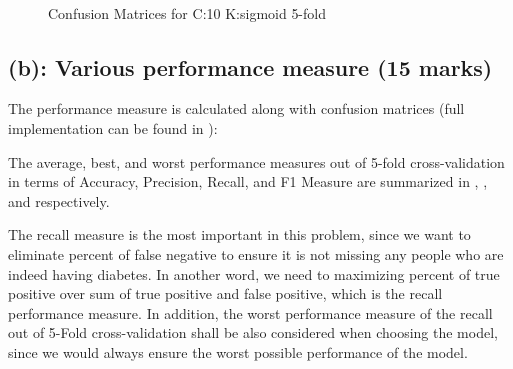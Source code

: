 \documentclass{tron}
\begin{document}
\begin{figure}[H]
 \,
 \,
\caption{Confusion Matrices for C:10 K:sigmoid 5-fold}
\label{table:confusion:16}
\end{figure}

\subsection{(b): Various performance measure (15 marks)}

The performance measure is calculated along with confusion matrices (full implementation can be found in ):


The average, best, and worst performance measures out of 5-fold cross-validation in terms of Accuracy, Precision, Recall, and F1 Measure are summarized in , , and  respectively.

The recall measure is the most important in this problem, since we want to eliminate percent of false negative to ensure it is not missing any people who are indeed having diabetes. In another word, we need to maximizing percent of true positive over sum of true positive and false positive, which is the recall performance measure. In addition, the worst performance measure of the recall out of 5-Fold cross-validation shall be also considered when choosing the model, since we would always ensure the worst possible performance of the model. 
\end{document}
